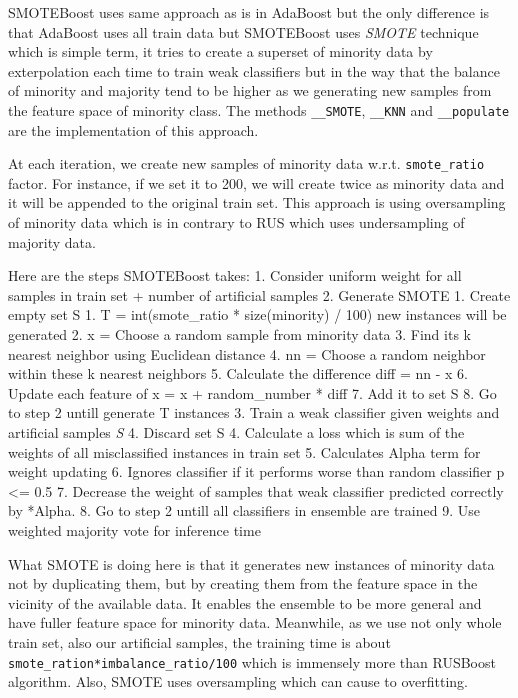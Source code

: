 \documentclass[11pt]{article}
\begin{document}
SMOTEBoost uses same approach as is in AdaBoost but the only difference
is that AdaBoost uses all train data but SMOTEBoost uses \emph{SMOTE}
technique which is simple term, it tries to create a superset of
minority data by exterpolation each time to train weak classifiers but
in the way that the balance of minority and majority tend to be higher
as we generating new samples from the feature space of minority class.
The methods \texttt{\_\_SMOTE}, \texttt{\_\_KNN} and
\texttt{\_\_populate} are the implementation of this approach.

At each iteration, we create new samples of minority data w.r.t.
\texttt{smote\_ratio} factor. For instance, if we set it to 200, we will
create twice as minority data and it will be appended to the original
train set. This approach is using oversampling of minority data which is
in contrary to RUS which uses undersampling of majority data.

Here are the steps SMOTEBoost takes: 1. Consider uniform weight for all
samples in train set + number of artificial samples 2. Generate SMOTE 1.
Create empty set S 1. T = int(smote\_ratio * size(minority) / 100) new
instances will be generated 2. x = Choose a random sample from minority
data 3. Find its k nearest neighbor using Euclidean distance 4. nn =
Choose a random neighbor within these k nearest neighbors 5. Calculate
the difference diff = nn - x 6. Update each feature of x = x +
random\_number * diff 7. Add it to set S 8. Go to step 2 untill generate
T instances 3. Train a weak classifier given weights and artificial
samples \emph{S} 4. Discard set S 4. Calculate a loss which is sum of
the weights of all misclassified instances in train set 5. Calculates
Alpha term for weight updating 6. Ignores classifier if it performs
worse than random classifier p \textless{}= 0.5 7. Decrease the weight
of samples that weak classifier predicted correctly by *Alpha. 8. Go to
step 2 untill all classifiers in ensemble are trained 9. Use weighted
majority vote for inference time

What SMOTE is doing here is that it generates new instances of minority
data not by duplicating them, but by creating them from the feature
space in the vicinity of the available data. It enables the ensemble to
be more general and have fuller feature space for minority data.
Meanwhile, as we use not only whole train set, also our artificial
samples, the training time is about
\texttt{smote\_ration*imbalance\_ratio/100} which is immensely more than
RUSBoost algorithm. Also, SMOTE uses oversampling which can cause to
overfitting.
\end{document}
